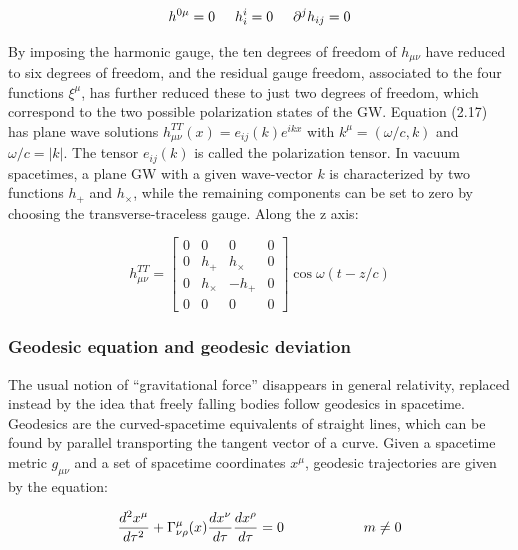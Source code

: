 \documentclass[binding=0.6cm, LaM]{sapthesis}
\begin{document}
		\begin{equation}
		h^{0\mu} = 0 \hspace*{0.5cm}  h^{i}_i = 0  \hspace*{0.5cm}   {\partial}^jh_{ij} = 0
		\end{equation}

	By imposing the harmonic gauge, the ten degrees of freedom of $h_{\mu\nu}$ 
	have reduced to six degrees of freedom, and the residual gauge freedom,
	associated to the four functions $\xi^{\mu}$, has further reduced these to just two degrees of freedom, 
	which correspond to the two possible polarization states of the GW. 
	Equation (2.17) has plane wave solutions $h_{\mu\nu}^{TT}(x)=e_{ij}(k)e^{ikx}$ with 
	$k^{\mu}=(\omega/c,k)$ and $\omega/c=|k|$. The tensor $e_{ij}(k)$ is called the polarization tensor. 
	In vacuum spacetimes, a plane GW with a given wave-vector $k$ is characterized 
	by two functions $h_+$ and $h_{\times}$, while the remaining components can be set to zero by
	choosing the transverse-traceless gauge. 
	Along the z axis:

		\begin{equation} 
		h_{\mu\nu}^{TT} = 
		\begin{bmatrix}
		0 & 0 & 0 & 0 \\
		0 & h_{+} & h_{\times} & 0 \\
		0 & h_{\times} & -h_{+} & 0 \\
		0 & 0 & 0 & 0 
		\end{bmatrix}\cos{\omega(t-z/c)}
		\end{equation}

\subsubsection{Geodesic equation and geodesic deviation}

	The usual notion of “gravitational force” disappears in general relativity, replaced instead 
	by the idea that freely falling bodies follow geodesics in spacetime.
	Geodesics are the curved-spacetime equivalents of straight lines, which can be found by 
	parallel transporting the tangent vector of a curve.
	Given a spacetime metric $g_{\mu\nu}$ and a set of spacetime coordinates $x^{\mu}$, 
	geodesic trajectories are given by the equation:

		\begin{equation}
		{{d^2x^{\mu}}\over{d\tau^2}} + \Gamma_{\nu\rho}^{\mu}(x){{dx^{\nu}}\over{d\tau}}{{dx^{\rho}}\over{d\tau}} = 0 \hspace*{2cm} m \neq 0
		\end{equation}
\end{document}

